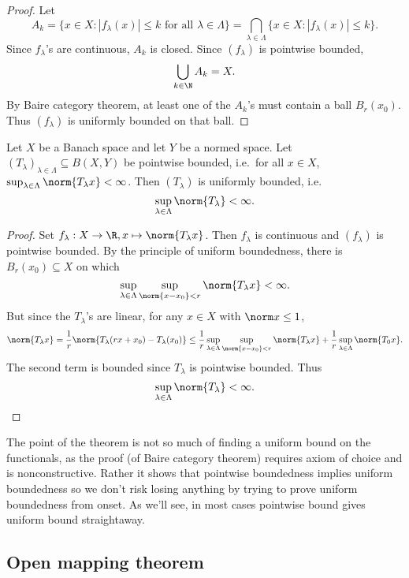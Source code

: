 \documentclass[a4paper]{article}
\begin{document}
\begin{proof}
  Let
  \[
    A_k = \{x \in X: |f_\lambda(x)| \leq k \text{ for all } \lambda \in \Lambda\}
    = \bigcap_{\lambda \in \Lambda} \{x \in X: |f_\lambda(x)| \leq k\}.
  \]
  Since \(f_\lambda\)'s are continuous, \(A_k\) is closed. Since \((f_\lambda)\) is pointwise bounded,
  \[
    \bigcup_{k \in \N} A_k = X.
  \]
  By Baire category theorem, at least one of the \(A_k\)'s must contain a ball \(B_r(x_0)\). Thus \((f_\lambda)\) is uniformly bounded on that ball.
\end{proof}

\begin{theorem}
  Let \(X\) be a Banach space and let \(Y\) be a normed space. Let \((T_\lambda)_{\lambda \in \Lambda} \subseteq B(X, Y)\) be pointwise bounded, i.e.\ for all \(x \in X\), \(\sup_{\lambda \in \Lambda} \norm{T_\lambda x} < \infty\). Then \((T_\lambda)\) is uniformly bounded, i.e.
  \[
    \sup_{\lambda \in \Lambda} \norm{T_\lambda} < \infty.
  \]
\end{theorem}

\begin{proof}
  Set \(f_\lambda: X \to \R, x \mapsto \norm{T_\lambda x}\). Then \(f_\lambda\) is continuous and \((f_\lambda)\) is pointwise bounded. By the principle of uniform boundedness, there is \(B_r(x_0) \subseteq X\) on which
  \[
    \sup_{\lambda \in \Lambda} \sup_{\norm{x - x_0} < r} \norm{T_\lambda x} < \infty.
  \]
  But since the \(T_\lambda\)'s are linear, for any \(x \in X\) with \(\norm x \leq 1\),
  \[
    \norm{T_\lambda x}
    = \frac{1}{r} \norm{T_\lambda(rx + x_0) - T_\lambda(x_0)}
    \leq \frac{1}{r} \sup_{\lambda \in \Lambda} \sup_{\norm{x - x_0} < r} \norm{T_\lambda x} + \frac{1}{r} \sup_{\lambda \in \Lambda} \norm{T_0x}.
  \]
  The second term is bounded since \(T_\lambda\) is pointwise bounded. Thus
  \[
    \sup_{\lambda \in \Lambda} \norm{T_\lambda} < \infty.
  \]
\end{proof}

The point of the theorem is not so much of finding a uniform bound on the functionals, as the proof (of Baire category theorem) requires axiom of choice and is nonconstructive. Rather it shows that pointwise boundedness implies uniform boundedness so we don't risk losing anything by trying to prove uniform boundedness from onset. As we'll see, in most cases pointwise bound gives uniform bound straightaway. %

\subsection{Open mapping theorem}
\end{document}
